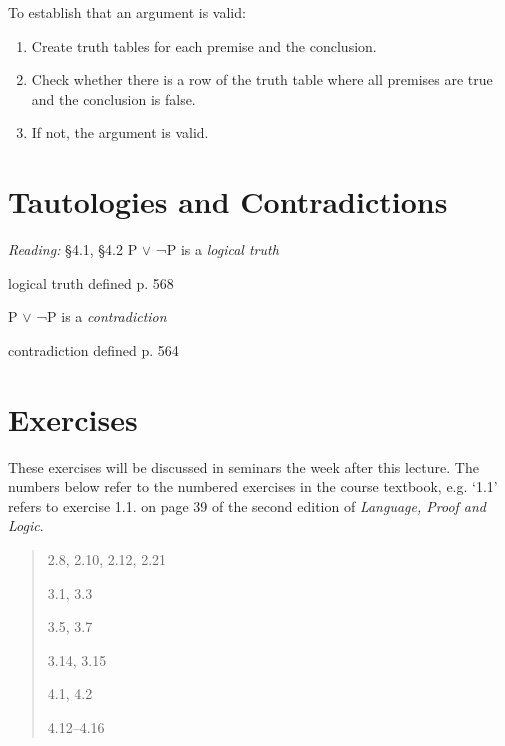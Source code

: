 \documentclass[12pt]{extarticle}
\begin{document}
\begin{multicols*}{3}
\begin{minipage}{\columnwidth}
 
To establish that an argument is valid:
 
\begin{enumerate}
 
\item Create truth tables for each premise and the conclusion.
 
\item Check whether there is a row of the truth table where all premises are true and the conclusion is false.
 
\item If not, the argument is valid.
 
\end{enumerate}
 
\end{minipage}
 
 
 
\section{Tautologies and Contradictions}
 
\emph{Reading:} §4.1, §4.2
 P $\lor{}$ ¬P is a \emph{logical truth}
 
logical truth defined p. 568
 
P $\lor{}$ ¬P is a \emph{contradiction}
 
contradiction defined p. 564
 
\vfill
\begin{minipage}{\columnwidth}
\section{Exercises}
These exercises will be discussed in seminars the week after this lecture.
The numbers below refer to the numbered exercises in the course textbook, e.g. `1.1' refers to exercise 1.1. on page 39 of the second edition of \emph{Language, Proof and Logic}.
 
\begin{quote}
2.8, 2.10, 2.12, 2.21
 
3.1, 3.3
 
3.5, 3.7
 
3.14, 3.15
 
4.1, 4.2
 
4.12--4.16
 
\end{quote}
\end{minipage}

 
\footnotesize 


\end{multicols*}
\end{document}

